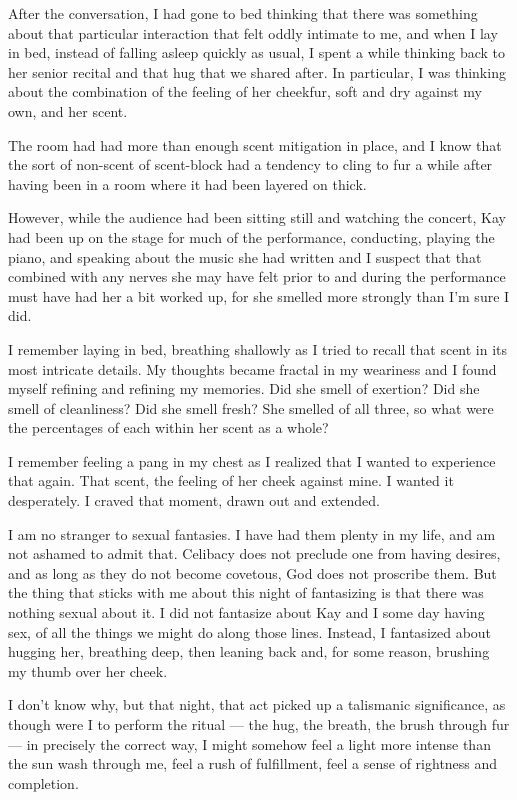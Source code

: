 After the conversation, I had gone to bed thinking that there was something about that particular interaction that felt oddly intimate to me, and when I lay in bed, instead of falling asleep quickly as usual, I spent a while thinking back to her senior recital and that hug that we shared after. In particular, I was thinking about the combination of the feeling of her cheekfur, soft and dry against my own, and her scent.

The room had had more than enough scent mitigation in place, and I know that the sort of non-scent of scent-block had a tendency to cling to fur a while after having been in a room where it had been layered on thick.

However, while the audience had been sitting still and watching the concert, Kay had been up on the stage for much of the performance, conducting, playing the piano, and speaking about the music she had written and I suspect that that combined with any nerves she may have felt prior to and during the performance must have had her a bit worked up, for she smelled more strongly than I'm sure I did.

I remember laying in bed, breathing shallowly as I tried to recall that scent in its most intricate details. My thoughts became fractal in my weariness and I found myself refining and refining my memories. Did she smell of exertion? Did she smell of cleanliness? Did she smell fresh? She smelled of all three, so what were the percentages of each within her scent as a whole?

I remember feeling a pang in my chest as I realized that I wanted to experience that again. That scent, the feeling of her cheek against mine. I wanted it desperately. I craved that moment, drawn out and extended.

I am no stranger to sexual fantasies. I have had them plenty in my life, and am not ashamed to admit that. Celibacy does not preclude one from having desires, and as long as they do not become covetous, God does not proscribe them. But the thing that sticks with me about this night of fantasizing is that there was nothing sexual about it. I did not fantasize about Kay and I some day having sex, of all the things we might do along those lines. Instead, I fantasized about hugging her, breathing deep, then leaning back and, for some reason, brushing my thumb over her cheek.

I don't know why, but that night, that act picked up a talismanic significance, as though were I to perform the ritual --- the hug, the breath, the brush through fur --- in precisely the correct way, I might somehow feel a light more intense than the sun wash through me, feel a rush of fulfillment, feel a sense of rightness and completion.

